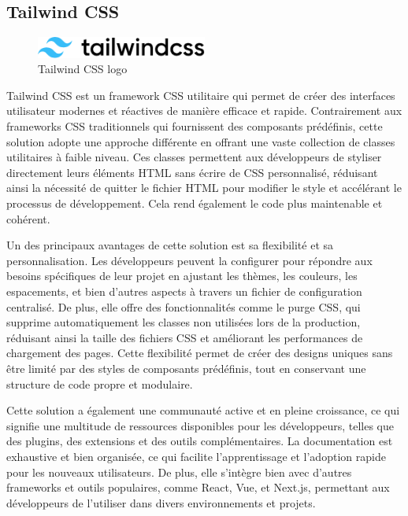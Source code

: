 \documentclass[a4paper,12pt]{report}
\numberwithin{equation}{section}
\begin{document}
\subsection{Tailwind CSS}
\begin{figure}[H]
    \centering
    \includegraphics[width=0.5\textwidth]{tech/tailwind.png}
    \caption{Tailwind CSS logo}
    \label{fig:Tailwind CSS logo}
\end{figure}
\par
Tailwind CSS est un framework CSS utilitaire qui permet de créer des interfaces utilisateur modernes et réactives de manière efficace et rapide. Contrairement aux frameworks CSS traditionnels qui fournissent des composants prédéfinis, cette solution adopte une approche différente en offrant une vaste collection de classes utilitaires à faible niveau. Ces classes permettent aux développeurs de styliser directement leurs éléments HTML sans écrire de CSS personnalisé, réduisant ainsi la nécessité de quitter le fichier HTML pour modifier le style et accélérant le processus de développement. Cela rend également le code plus maintenable et cohérent.
\\ \par
Un des principaux avantages de cette solution est sa flexibilité et sa personnalisation. Les développeurs peuvent la configurer pour répondre aux besoins spécifiques de leur projet en ajustant les thèmes, les couleurs, les espacements, et bien d'autres aspects à travers un fichier de configuration centralisé. De plus, elle offre des fonctionnalités comme le purge CSS, qui supprime automatiquement les classes non utilisées lors de la production, réduisant ainsi la taille des fichiers CSS et améliorant les performances de chargement des pages. Cette flexibilité permet de créer des designs uniques sans être limité par des styles de composants prédéfinis, tout en conservant une structure de code propre et modulaire.
\\ \par
Cette solution a également une communauté active et en pleine croissance, ce qui signifie une multitude de ressources disponibles pour les développeurs, telles que des plugins, des extensions et des outils complémentaires. La documentation est exhaustive et bien organisée, ce qui facilite l'apprentissage et l'adoption rapide pour les nouveaux utilisateurs. De plus, elle s'intègre bien avec d'autres frameworks et outils populaires, comme React, Vue, et Next.js, permettant aux développeurs de l'utiliser dans divers environnements et projets. 
\newpage
\end{document}
